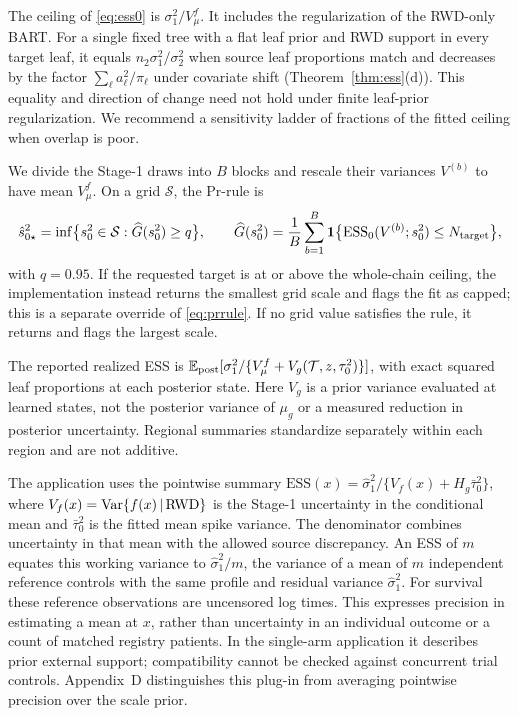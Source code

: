 The ceiling of \eqref{eq:ess0} is $\sigma_1^2/V_\mu^f$. It includes the regularization of the RWD-only BART. For a single fixed tree with a flat leaf prior and RWD support in every target leaf, it equals $n_2\sigma_1^2/\sigma_2^2$ when source leaf proportions match and decreases by the factor $\sum_\ell a_\ell^2/\pi_\ell$ under covariate shift (Theorem~\ref{thm:ess}(d)). This equality and direction of change need not hold under finite leaf-prior regularization. We recommend a sensitivity ladder of fractions of the fitted ceiling when overlap is poor.

We divide the Stage-1 draws into $B$ blocks and rescale their variances $V^{(b)}$ to have mean $V_\mu^f$. On a grid $\mathcal S$, the Pr-rule is
\begin{equation}
\hat s^2_{0\star}=\inf\bigl\{s_0^2\in\mathcal S:\widehat G(s_0^2)\ge q\bigr\},\qquad
\widehat G(s_0^2)=\frac1B\sum_{b=1}^B\mathbf 1\bigl\{\mathrm{ESS}_0(V^{(b)};s_0^2)\le N_{\rm target}\bigr\},
\label{eq:prrule}
\end{equation}
with $q=0.95$. If the requested target is at or above the whole-chain ceiling, the implementation instead returns the smallest grid scale and flags the fit as capped; this is a separate override of \eqref{eq:prrule}. If no grid value satisfies the rule, it returns and flags the largest scale.

The reported realized ESS is $\mathbb{E}_{\rm post}[\sigma_1^2/\{V_\mu^f+V_g(\mathcal T,z,\tau_0^2)\}]$, with exact squared leaf proportions at each posterior state. Here $V_g$ is a prior variance evaluated at learned states, not the posterior variance of $\mu_g$ or a measured reduction in posterior uncertainty. Regional summaries standardize separately within each region and are not additive.

The application uses the pointwise summary $\mathrm{ESS}(x)=\hat\sigma_1^2/\{V_f(x)+H_g\bar\tau_0^2\}$, where $V_f(x)=\mathrm{Var}\{f(x)\,\vert\,\mathrm{RWD}\}$ is the Stage-1 uncertainty in the conditional mean and $\bar\tau_0^2$ is the fitted mean spike variance. The denominator combines uncertainty in that mean with the allowed source discrepancy. An ESS of $m$ equates this working variance to $\hat\sigma_1^2/m$, the variance of a mean of $m$ independent reference controls with the same profile and residual variance $\hat\sigma_1^2$. For survival these reference observations are uncensored log times. This expresses precision in estimating a mean at $x$, rather than uncertainty in an individual outcome or a count of matched registry patients. In the single-arm application it describes prior external support; compatibility cannot be checked against concurrent trial controls. Appendix~D distinguishes this plug-in from averaging pointwise precision over the scale prior.

